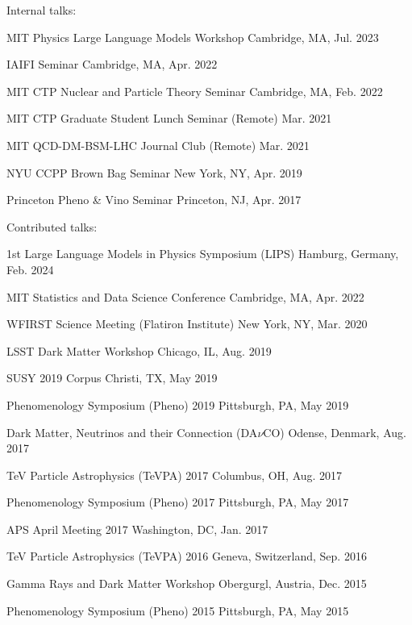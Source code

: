 \documentclass[letterpaper,11pt]{article}
\newenvironment{packed_itemize}{
\begin{itemize}[label=\raisebox{0.25ex}{\tiny$\bullet$}]
  \setlength{\itemsep}{4.2pt}
  \setlength{\parskip}{0pt}
  \setlength{\parsep}{0pt}}{\end{itemize}
}
\begin{document}
\noindent
Internal talks:
\begin{packed_itemize}
  \item MIT Physics Large Language Models Workshop \hfill Cambridge, MA, Jul. 2023
  \item IAIFI Seminar \hfill Cambridge, MA, Apr. 2022
  \item MIT CTP Nuclear and Particle Theory Seminar \hfill Cambridge, MA, Feb. 2022
  \item MIT CTP Graduate Student Lunch Seminar (Remote) \hfill Mar. 2021
  \item MIT QCD-DM-BSM-LHC Journal Club (Remote) \hfill Mar. 2021
  \item NYU CCPP Brown Bag Seminar \hfill New York, NY, Apr. 2019
  \item Princeton Pheno \& Vino Seminar \hfill Princeton, NJ, Apr. 2017
\end{packed_itemize}

\noindent
Contributed talks:
\begin{packed_itemize}
  \item 1st Large Language Models in Physics Symposium (LIPS)  \hfill Hamburg, Germany, Feb. 2024
  \item MIT Statistics and Data Science Conference  \hfill Cambridge, MA, Apr. 2022
  \item WFIRST Science Meeting (Flatiron Institute) \hfill New York, NY, Mar. 2020
  \item LSST Dark Matter Workshop \hfill Chicago, IL, Aug. 2019
  \item SUSY 2019 \hfill Corpus Christi, TX, May 2019
  \item Phenomenology Symposium (Pheno) 2019 \hfill Pittsburgh, PA, May 2019
  \item Dark Matter, Neutrinos and their Connection (DA$\nu$CO) \hfill Odense, Denmark, Aug. 2017
  \item TeV Particle Astrophysics (TeVPA) 2017 \hfill Columbus, OH, Aug. 2017 
  \item Phenomenology Symposium (Pheno) 2017 \hfill Pittsburgh, PA, May 2017 
  \item APS April Meeting 2017 \hfill Washington, DC, Jan. 2017 
  \item TeV Particle Astrophysics (TeVPA) 2016 \hfill Geneva, Switzerland, Sep. 2016 
  \item Gamma Rays and Dark Matter Workshop \hfill Obergurgl, Austria, Dec. 2015
  \item Phenomenology Symposium (Pheno) 2015 \hfill Pittsburgh, PA, May 2015
\end{packed_itemize}
\vspace{2.0mm}
\end{document}
